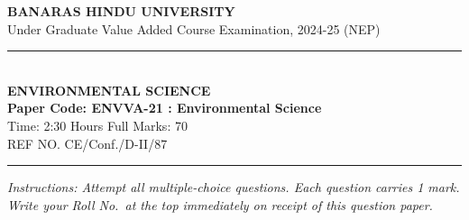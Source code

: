 \documentclass[11pt,a4paper]{article}
\begin{document}
\begin{center}
  {\large\bfseries BANARAS HINDU UNIVERSITY}\\[2pt]
  {\normalsize Under Graduate Value Added Course Examination, 2024-25 (NEP)}\\[6pt]
  \rule{0.8\linewidth}{0.5pt}\\[6pt]
  {\large\bfseries ENVIRONMENTAL SCIENCE}\\[4pt]
  {\large\bfseries Paper Code: ENVVA-21 : Environmental Science}\\[4pt]
  {\normalsize Time: 2:30 Hours \hfill Full Marks: 70}\\[2pt]
  {\small REF NO. CE/Conf./D-II/87}
\end{center}
\rule{\linewidth}{0.4pt}
\smallskip

\noindent \textit{Instructions: Attempt all multiple-choice questions. Each question carries 1 mark. Write your Roll No.\ at the top immediately on receipt of this question paper.}

\bigskip
\end{document}
